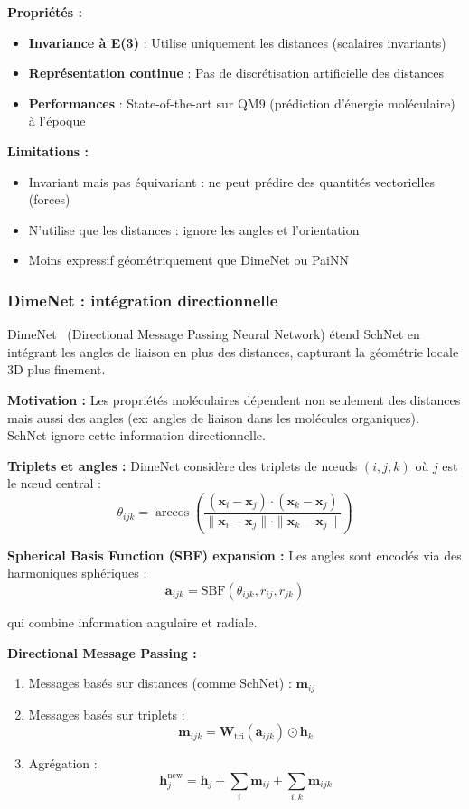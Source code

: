 \textbf{Propriétés :}
\begin{itemize}
    \item \textbf{Invariance à E(3)} : Utilise uniquement les distances (scalaires invariants)
    \item \textbf{Représentation continue} : Pas de discrétisation artificielle des distances
    \item \textbf{Performances} : State-of-the-art sur QM9 (prédiction d'énergie moléculaire) à l'époque
\end{itemize}

\textbf{Limitations :}
\begin{itemize}
    \item Invariant mais pas équivariant : ne peut prédire des quantités vectorielles (forces)
    \item N'utilise que les distances : ignore les angles et l'orientation
    \item Moins expressif géométriquement que DimeNet ou PaiNN
\end{itemize}

\subsubsection{DimeNet : intégration directionnelle}

DimeNet~\cite{Klicpera2020,Gasteiger2020} (Directional Message Passing Neural Network) étend SchNet en intégrant les angles de liaison en plus des distances, capturant la géométrie locale 3D plus finement.

\textbf{Motivation :}
Les propriétés moléculaires dépendent non seulement des distances mais aussi des angles (ex: angles de liaison dans les molécules organiques). SchNet ignore cette information directionnelle.

\textbf{Triplets et angles :}
DimeNet considère des triplets de nœuds $(i, j, k)$ où $j$ est le nœud central :
\[
\theta_{ijk} = \arccos\left(\frac{(\mathbf{x}_i - \mathbf{x}_j) \cdot (\mathbf{x}_k - \mathbf{x}_j)}{\|\mathbf{x}_i - \mathbf{x}_j\| \cdot \|\mathbf{x}_k - \mathbf{x}_j\|}\right)
\]

\textbf{Spherical Basis Function (SBF) expansion :}
Les angles sont encodés via des harmoniques sphériques :
\[
\mathbf{a}_{ijk} = \text{SBF}(\theta_{ijk}, r_{ij}, r_{jk})
\]

qui combine information angulaire et radiale.

\textbf{Directional Message Passing :}
\begin{enumerate}
    \item Messages basés sur distances (comme SchNet) : $\mathbf{m}_{ij}$
    \item Messages basés sur triplets :
    \[
    \mathbf{m}_{ijk} = \mathbf{W}_{\text{tri}}(\mathbf{a}_{ijk}) \odot \mathbf{h}_k
    \]
    \item Agrégation :
    \[
    \mathbf{h}_j^{\text{new}} = \mathbf{h}_j + \sum_i \mathbf{m}_{ij} + \sum_{i,k} \mathbf{m}_{ijk}
    \]
\end{enumerate}

